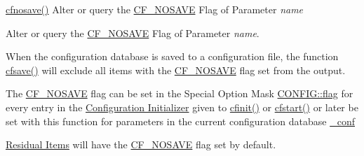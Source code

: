 \hyperlink{group__setting__saving_ga0f6ed90e3ecfa0074af1635a0e4339ef}{cfnosave()} Alter or query the \hyperlink{group__special__options__mask_gad76153c65f68cc0ee5c1a04c8c3e80bf}{C\-F\-\_\-\-N\-O\-S\-A\-V\-E} Flag of Parameter {\itshape name\/} 

Alter or query the \hyperlink{group__special__options__mask_gad76153c65f68cc0ee5c1a04c8c3e80bf}{C\-F\-\_\-\-N\-O\-S\-A\-V\-E} Flag of Parameter {\itshape name\/}.

When the configuration database is saved to a configuration file, the function \hyperlink{group__setting__saving_gaad7e1267cd904b4480a0eeaeb03b5f75}{cfsave()} will exclude all items with the \hyperlink{group__special__options__mask_gad76153c65f68cc0ee5c1a04c8c3e80bf}{C\-F\-\_\-\-N\-O\-S\-A\-V\-E} flag set from the output.

The \hyperlink{group__special__options__mask_gad76153c65f68cc0ee5c1a04c8c3e80bf}{C\-F\-\_\-\-N\-O\-S\-A\-V\-E} flag can be set in the Special Option Mask \hyperlink{struct_c_o_n_f_i_g_ab04d08abdf758c0400caaded716f4089}{C\-O\-N\-F\-I\-G\-::flag} for every entry in the \hyperlink{config_initializer}{Configuration Initializer} given to \hyperlink{group__cflib__core_ga64fb341565c2ddfccd6669e5e6265a8a}{cfinit()} or \hyperlink{group__cflib__core_ga6e04a462f9ad273de914af386ff15623}{cfstart()} or later be set with this function for parameters in the current configuration database \hyperlink{group__cflib__core_ga7d0fec33ada97c2d7ef78e6c3d83da97}{\-\_\-conf}

\hyperlink{config_levels_residuals}{Residual Items} will have the \hyperlink{group__special__options__mask_gad76153c65f68cc0ee5c1a04c8c3e80bf}{C\-F\-\_\-\-N\-O\-S\-A\-V\-E} flag set by default.


